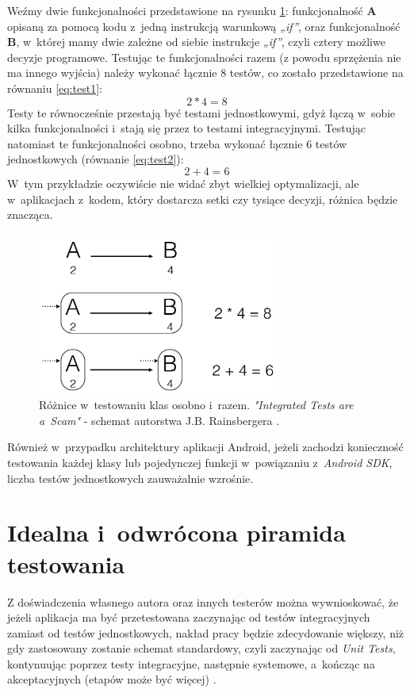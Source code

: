 Weźmy dwie funkcjonalności przedstawione na rysunku \ref{fig:testowanie_klas}: funkcjonalność \textbf{A} opisaną za pomocą kodu z~jedną instrukcją warunkową \textit{„if”}, oraz funkcjonalność \textbf{B}, w~której mamy dwie zależne od siebie instrukcje \textit{„if”}, czyli cztery możliwe decyzje programowe. Testując te funkcjonalności razem (z powodu sprzężenia nie ma innego wyjścia) należy wykonać łącznie 8 testów, co zostało przedstawione na równaniu \ref{eq:test1}:
\begin{equation}
2*4=8 \label{eq:test1}
\end{equation}
Testy te równocześnie przestają być testami jednostkowymi, gdyż łączą w~sobie kilka funkcjonalności i~stają się przez to testami integracyjnymi. Testując natomiast te funkcjonalności osobno, trzeba wykonać łącznie 6 testów jednostkowych (równanie \ref{eq:test2}):
\begin{equation}
2+4=6 \label{eq:test2}
\end{equation}
W~tym przykładzie oczywiście nie widać zbyt wielkiej optymalizacji, ale w~aplikacjach z~kodem, który dostarcza setki czy tysiące decyzji, różnica będzie znacząca.

\begin{figure}[!htb]
    \centering
    \includegraphics[width=8cm]{imgs/ch3_przyklad_testowania_klas_pl.png}
    \caption
{Różnice w~testowaniu klas osobno i~razem. \textit{"Integrated Tests are a~Scam"} - schemat autorstwa J.B. Rainsbergera \cite{website:android:testowanieklas}.}
    \label{fig:testowanie_klas}
\end{figure} 

Również w~przypadku architektury aplikacji Android, jeżeli zachodzi konieczność testowania każdej klasy lub pojedynczej funkcji w~powiązaniu z~\textit{Android SDK}, liczba testów jednostkowych zauważalnie wzrośnie.

\section{Idealna i~odwrócona piramida testowania}
\label{piramida_testowania}
Z doświadczenia własnego autora oraz innych testerów można wywnioskować, że jeżeli aplikacja ma być przetestowana zaczynając od testów integracyjnych zamiast od testów jednostkowych, nakład pracy będzie zdecydowanie większy, niż gdy zastosowany zostanie schemat standardowy, czyli zaczynając od \textit{Unit Tests}, kontynuując poprzez testy integracyjne, następnie systemowe, a~kończąc na akceptacyjnych (etapów może być więcej) \cite{bib:android:testing:learning}. 

